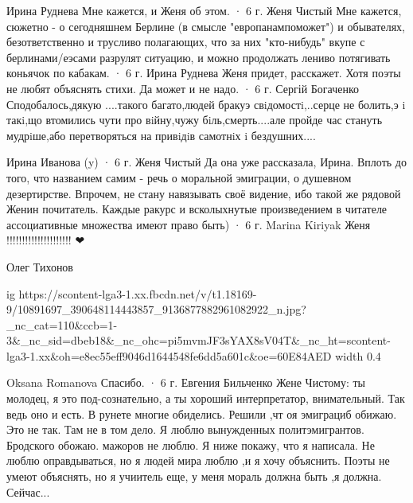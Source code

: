 Ирина Руднева
Мне кажется, и Женя об этом.
 · 6 г.
Женя Чистый
Мне кажется, сюжетно - о сегодняшнем Берлине (в смысле "европанампоможет") и обывателях, безответственно и трусливо полагающих, что за них "кто-нибудь" вкупе с берлинами/еэсами разрулят ситуацию, и можно продолжать лениво потягивать коньячок по кабакам.
 · 6 г.
Ирина Руднева
Женя придет, расскажет. Хотя поэты не любят объяснять стихи. Да может и не надо.
 · 6 г.
Сергій Богаченко
Сподобалось,дякую ....такого багато,людей бракуэ свiдомостi,..серце не болить,э i такi,що втомились чути про вiйну,чужу бiль,смерть....але пройде час стануть мудрiше,або перетворяться на привiдiв самотнiх i бездушних....

Ирина Иванова
(y)
 · 6 г.
Женя Чистый
Да она уже рассказала, Ирина. Вплоть до того, что названием самим - речь о моральной эмиграции, о душевном дезертирстве. Впрочем, не стану навязывать своё видение, ибо такой же рядовой Женин почитатель. Каждые ракурс и всколыхнутые произведением в читателе ассоциативные множества имеют право быть)
 · 6 г.
Marina Kiriyak
Женя !!!!!!!!!!!!!!!!!!!!! ❤

Олег Тихонов

\ifcmt
  ig https://scontent-lga3-1.xx.fbcdn.net/v/t1.18169-9/10891697_390648114443857_9136877882961082922_n.jpg?_nc_cat=110&ccb=1-3&_nc_sid=dbeb18&_nc_ohc=pi5mvmJF3sYAX8sV04T&_nc_ht=scontent-lga3-1.xx&oh=e8ec55eff9046d1644548fe6dd5a601c&oe=60E84AED
  width 0.4
\fi


Oksana Romanova
Спасибо.
 · 6 г.
Евгения Бильченко
Жене Чистому: ты молодец, я это под-сознательно, а ты хороший интерпретатор, внимательный. Так ведь оно и есть. В рунете многие обиделись. Решили ,чт оя эмиграциб обижаю. Это не так. Там не в том дело. Я люблю вынужденных политэмигрантов. Бродского обожаю. мажоров не люблю. Я ниже покажу, что я написала. Не люблю оправдываться, но я людей мира люблю ,и я хочу объяснить. Поэты не умеют объяснять, но я учиитель еще, у меня мораль должна быть ,я должна. Сейчас...

